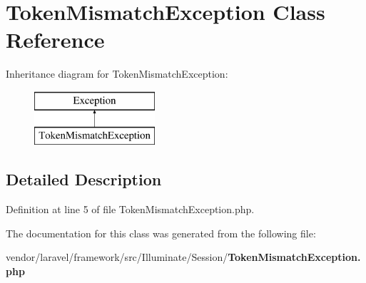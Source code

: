 \section{Token\+Mismatch\+Exception Class Reference}
\label{class_illuminate_1_1_session_1_1_token_mismatch_exception}
Inheritance diagram for Token\+Mismatch\+Exception\+:\begin{figure}[H]
\begin{center}
\leavevmode
\includegraphics[height=2.000000cm]{class_illuminate_1_1_session_1_1_token_mismatch_exception}
\end{center}
\end{figure}


\subsection{Detailed Description}


Definition at line 5 of file Token\+Mismatch\+Exception.\+php.



The documentation for this class was generated from the following file\+:\begin{DoxyCompactItemize}
\item 
vendor/laravel/framework/src/\+Illuminate/\+Session/{\bf Token\+Mismatch\+Exception.\+php}\end{DoxyCompactItemize}
